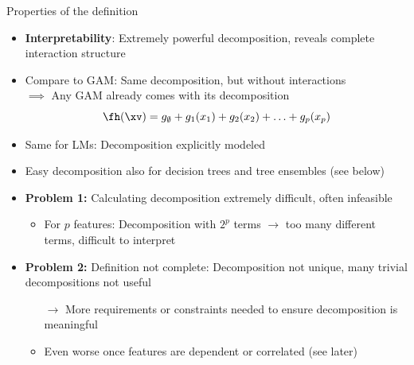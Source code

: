 \documentclass[11pt,compress,t,notes=noshow, aspectratio=169, xcolor=table]{beamer}
\begin{document}
\begin{frame}{Properties of the definition}
\begin{itemize}
    \item \textbf{Interpretability}: Extremely powerful decomposition, reveals complete interaction structure
    \pause
    \item Compare to GAM: Same decomposition, but without interactions \\
    $\implies$ Any GAM already comes with its decomposition
    $$
    \fh (\xv) = g_\emptyset + g_1(x_1) + g_2(x_2) + \ldots + g_p(x_p)
    $$
    \item Same for LMs: Decomposition explicitly modeled
    \pause
    \item Easy decomposition also for decision trees and tree ensembles (see below)
    \pause
    \item \textbf{Problem 1:} Calculating decomposition extremely difficult, often infeasible
    \begin{itemize}
        \item For \(p\) features: Decomposition with \(2^p\) terms \(\rightarrow\) too many different terms, difficult to interpret
    \end{itemize}
    \pause
    \item \textbf{Problem 2:} Definition not complete: Decomposition not unique, many trivial decompositions not useful
    \begin{itemize}
        \item[$\rightarrow$] More requirements or constraints needed to ensure decomposition is meaningful
        \item Even worse once features are dependent or correlated (see later)
    \end{itemize}


\end{itemize}
\end{frame}
\end{document}
